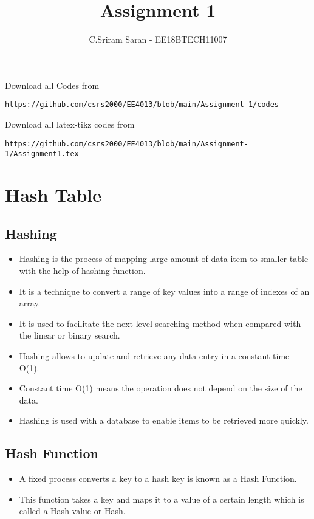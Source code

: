 \documentclass[journal,12pt,twocolumn]{IEEEtran}
\begin{document}
     \def\rightbox#1{\makebox[0in][r]{#1}}
     \def\centbox#1{\makebox[0in]{#1}}
     \def\topbox#1{\raisebox{-\baselineskip}[0in][0in]{#1}}
     \def\midbox#1{\raisebox{-0.5\baselineskip}[0in][0in]{#1}}
\vspace{3cm}
\title{Assignment 1}
\author{C.Sriram Saran - EE18BTECH11007}
\maketitle
\newpage
\bigskip
\renewcommand{\thefigure}{\theenumi}
\renewcommand{\thetable}{\theenumi}
Download all Codes from 
%
\begin{lstlisting}
https://github.com/csrs2000/EE4013/blob/main/Assignment-1/codes
\end{lstlisting}
Download all latex-tikz codes from 

\begin{lstlisting}
https://github.com/csrs2000/EE4013/blob/main/Assignment-1/Assignment1.tex
\end{lstlisting}
\section{\textbf{Hash Table}}
\subsection{\textbf{Hashing}}
\begin{itemize}
\item Hashing is the process of mapping large amount of data item to smaller table with the help of hashing function.
\item It is a technique to convert a range of key values into a range of indexes of an array.
\item It is used to facilitate the next level searching method when compared with the linear or binary search.
\item Hashing allows to update and retrieve any data entry in a constant time O(1).
\item Constant time O(1) means the operation does not depend on the size of the data.
\item Hashing is used with a database to enable items to be retrieved more quickly.
\end{itemize}
\subsection{\textbf{Hash Function}}
\begin{itemize}
\item A fixed process converts a key to a hash key is known as a Hash Function.
\item This function takes a key and maps it to a value of a certain length which is called a Hash value or Hash.
\end{itemize}
\end{document}
